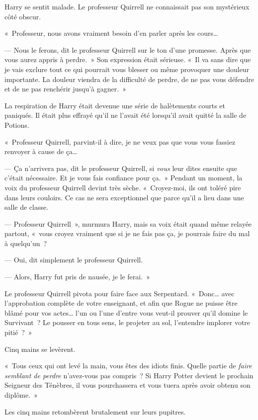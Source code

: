 Harry se sentit malade.
Le professeur Quirrell ne connaissait pas son mystérieux côté obscur.

«~Professeur, nous avons vraiment besoin d'en parler après les cours…

--- Nous le ferons, dit le professeur Quirrell sur le ton d'une promesse.
Après que vous aurez appris à perdre.~»
Son expression était sérieuse.
«~Il va sans dire que je vais exclure tout ce qui pourrait vous blesser ou même provoquer une douleur importante.
La douleur viendra de la difficulté de perdre, de ne pas vous défendre et de ne pas renchérir jusqu'à gagner.~»

La respiration de Harry était devenue une série de halètements courts et paniqués.
Il était plus effrayé qu'il ne l'avait été lorsqu'il avait quitté la salle de Potions.

«~Professeur Quirrell, parvint-il à dire, je ne veux pas que vous vous fassiez renvoyer à cause de ça…

--- Ça n'arrivera pas, dit le professeur Quirrell, si \emph{vous} leur dites ensuite que c'était nécessaire.
Et je vous fais confiance pour ça.~»
Pendant un moment, la voix du professeur Quirrell devint très sèche.
«~Croyez-moi, ils ont toléré pire dans leurs couloirs.
Ce cas ne sera exceptionnel que parce qu'il a lieu dans une salle de classe.

--- Professeur Quirrell~», murmura Harry, mais sa voix était quand même relayée partout, «~vous croyez vraiment que si je ne fais pas ça, je pourrais faire du mal à quelqu'un~?

--- Oui, dit simplement le professeur Quirrell.

--- Alors, Harry fut pris de nausée, je le ferai.~»

Le professeur Quirrell pivota pour faire face aux Serpentard.
«~Donc… avec l'approbation complète de votre enseignant, et afin que Rogue ne puisse être blâmé pour vos actes… l'un ou l'une d'entre vous veut-il prouver qu'il domine le Survivant~?
Le pousser en tous sens, le projeter au sol, l'entendre implorer votre pitié~?~»

Cinq mains se levèrent.

«~Tous ceux qui ont levé la main, vous êtes des idiots finis.
Quelle partie de \emph{faire semblant de perdre} n'avez-vous pas compris~?
Si Harry Potter devient le prochain Seigneur des Ténèbres, il vous pourchassera et vous tuera après avoir obtenu son diplôme.~»

Les cinq mains retombèrent brutalement sur leurs pupitres.

